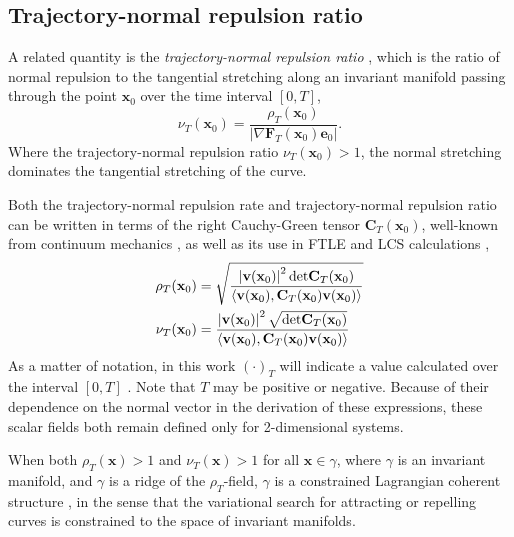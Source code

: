 \documentclass[twocolumn]{svjour3}
\newcommand{\edit}[3]{{\color{red} #2}}
\begin{document}
\subsection{Trajectory-normal repulsion ratio}
A related quantity is the {\it trajectory-normal repulsion ratio} \cite{haller_variational_2011}, which is the ratio of normal repulsion to the tangential stretching along an invariant manifold passing through the point $\textbf{x}_0$ over the time interval $[0, T]$,
\begin{equation}
\nu_T(\mathbf{x}_0) = \frac{\rho_T(\mathbf{x}_0)}{\left|\nabla\mathbf{F}_T (\mathbf{x}_0) \mathbf{e}_0\right|}.
\end{equation}
Where the trajectory-normal repulsion ratio \(\nu_T(\mathbf{x}_0)>1\), the normal stretching dominates the tangential stretching of the curve. 

Both the trajectory-normal repulsion rate and trajectory-normal repulsion ratio can be written in terms of the right Cauchy-Green tensor $\mathbf{C}_T (\mathbf{x}_0)$, well-known from continuum mechanics \cite{truesdell2004non}, as well as its use in FTLE and LCS calculations \cite{haller_variational_2011},
\begin{equation}
\begin{aligned}
\rho_T(\mathbf{x}_0) 
& = \sqrt{ \frac{
\left| \mathbf{v}(\mathbf{x}_0)\right|^2 {\rm det} \mathbf{C}_T (\mathbf{x}_0)}{
\langle \mathbf{v}(\mathbf{x}_0),\mathbf{C}_T (\mathbf{x}_0) \mathbf{v}(\mathbf{x}_0) \rangle
} } \\
\nu_T(\mathbf{x}_0) 
& =  \frac{
\left| \mathbf{v}(\mathbf{x}_0)\right|^2 \sqrt{{\rm det} \mathbf{C}_T (\mathbf{x}_0)}}{
\langle \mathbf{v}(\mathbf{x}_0),\mathbf{C}_T (\mathbf{x}_0) \mathbf{v}(\mathbf{x}_0) \rangle
}
\end{aligned}
\label{eq:rhoT}
\end{equation}
As a matter of notation, in this work \((\cdot)_T\) will indicate a value calculated over the interval $[0, T]$ \edit{and \((\cdot)^\dagger\) will indicate the matrix transpose}{}{6}. Note that $T$ may be positive or negative. Because of their dependence on the normal vector in the derivation of these expressions, these scalar fields both remain defined only for 2-dimensional systems.

When both $\rho_T(\mathbf{x})>1$ and $\nu_T(\mathbf{x})>1$ for all $\mathbf{x}\in\gamma$, where $\gamma$ is an invariant manifold, and $\gamma$ is a ridge of the $\rho_T$-field, $\gamma$ is a constrained Lagrangian coherent structure \cite{haller_variational_2011}, in the sense that the variational search for attracting or repelling curves is constrained to the space of invariant manifolds.
\end{document}

